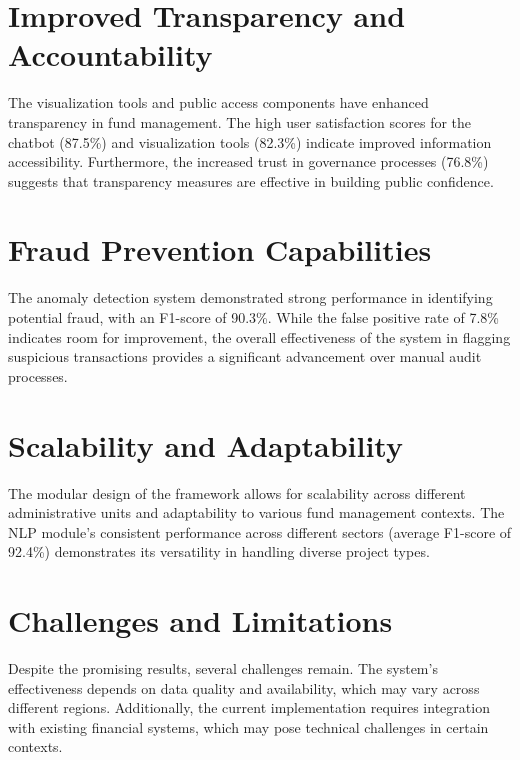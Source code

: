 \documentclass[12pt,a4paper]{report}
\begin{document}
\section{Improved Transparency and Accountability}
\indent \indent The visualization tools and public access components have enhanced transparency in fund management. The high user satisfaction scores for the chatbot (87.5\%) and visualization tools (82.3\%) indicate improved information accessibility. Furthermore, the increased trust in governance processes (76.8\%) suggests that transparency measures are effective in building public confidence.

\section{Fraud Prevention Capabilities}
\indent \indent The anomaly detection system demonstrated strong performance in identifying potential fraud, with an F1-score of 90.3\%. While the false positive rate of 7.8\% indicates room for improvement, the overall effectiveness of the system in flagging suspicious transactions provides a significant advancement over manual audit processes.

\section{Scalability and Adaptability}
\indent \indent The modular design of the framework allows for scalability across different administrative units and adaptability to various fund management contexts. The NLP module's consistent performance across different sectors (average F1-score of 92.4\%) demonstrates its versatility in handling diverse project types.

\section{Challenges and Limitations}
\indent \indent Despite the promising results, several challenges remain. The system's effectiveness depends on data quality and availability, which may vary across different regions. Additionally, the current implementation requires integration with existing financial systems, which may pose technical challenges in certain contexts.
\end{document}
